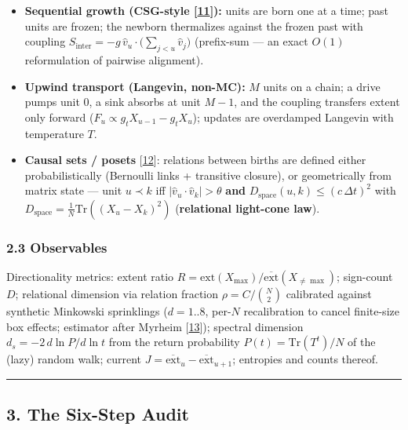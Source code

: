 \begin{itemize}
\tightlist
\item
  \textbf{Sequential growth (CSG-style {[}\hyperref[ref-11]{11}{]}):}
  units are born one at a time; past units are frozen; the newborn
  thermalizes against the frozen past with coupling
  \(S_{\mathrm{inter}} = -g\,\hat v_u\cdot \big(\sum_{j<u}\hat v_j\big)\)
  (prefix-sum --- an exact \(O(1)\) reformulation of pairwise
  alignment).
\item
  \textbf{Upwind transport (Langevin, non-MC):} \(M\) units on a chain;
  a drive pumps unit \(0\), a sink absorbs at unit \(M-1\), and the
  coupling transfers extent only forward
  (\(F_u \propto g_t X_{u-1} - g_t X_u\)); updates are overdamped
  Langevin with temperature \(T\).
\item
  \textbf{Causal sets / posets} {[}\hyperref[ref-12]{12}{]}: relations
  between births are defined either probabilistically (Bernoulli links +
  transitive closure), or geometrically from matrix state --- unit
  \(u\prec k\) iff \(|\hat v_u\cdot \hat v_k|>\theta\) \textbf{and}
  \(D_{\mathrm{space}}(u,k)\le (c\,\Delta t)^2\) with
  \(D_{\mathrm{space}} = \frac{1}{N}\mathrm{Tr}((X_u-X_k)^2)\)
  (\textbf{relational light-cone law}).
\end{itemize}

\subsubsection{2.3 Observables}\label{observables}

Directionality metrics: extent ratio
\(R=\mathrm{ext}(X_{\max})/\overline{\mathrm{ext}}(X_{\neq\max})\);
sign-count \(D\); relational dimension via relation fraction
\(\rho = C/\binom{N}{2}\) calibrated against synthetic Minkowski
sprinklings (\(d=1..8\), per-\(N\) recalibration to cancel finite-size
box effects; estimator after Myrheim {[}\hyperref[ref-13]{13}{]});
spectral dimension \(d_s = -2\,d\ln P/d\ln t\) from the return
probability \(P(t)=\mathrm{Tr}(T^t)/N\) of the (lazy) random walk;
current
\(J = \overline{\mathrm{ext}}_{u} - \overline{\mathrm{ext}}_{u+1}\);
entropies and counts thereof.

\begin{center}\rule{0.5\linewidth}{0.5pt}\end{center}

\subsection{3. The Six-Step Audit}\label{the-six-step-audit}

